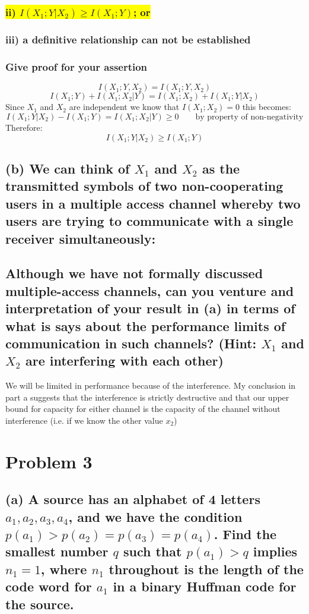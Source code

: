 \documentclass[11pt, oneside]{book}   	%
\begin{document}
\subsubsection{\colorbox{yellow}{ ii)  $I(X_1;Y|X_2) \geq I(X_1;Y)$; or} }
\subsubsection{iii) a definitive relationship can not be established }
\subsubsection{Give proof for your assertion}

$$I(X_1;Y,X_2) = I(X_1;Y,X_2)$$
$$I(X_1;Y) + I(X_1;X_2|Y) = I(X_1;X_2)+I(X_1;Y|X_2)$$
Since $X_1$ and $X_2$ are independent we know that $I(X_1;X_2)=0$ this becomes:
$$I(X_1;Y|X_2) - I(X_1;Y) = I(X_1;X_2|Y) \geq 0 \qquad \text{by property of non-negativity}$$
Therefore:
$$I(X_1;Y|X_2) \geq I(X_1;Y)$$

\subsection*{(b) We can think of $X_1$ and $X_2$ as the transmitted symbols of two non-cooperating users in a multiple access channel whereby two users are trying to communicate with a single receiver simultaneously:\\\\
Although we have not formally discussed multiple-access channels, can you venture and interpretation of your result in (a) in terms of what is says about the performance limits of communication in such channels? (Hint: $X_1$ and $X_2$ are interfering with each other)}

We will be limited in performance because of the interference.  My conclusion in part a suggests that the interference is strictly destructive and that our upper bound for capacity for either channel is the capacity of the channel without interference (i.e. if we know the other value $x_2$)



\section{Problem 3}
\subsection*{(a) A source has an alphabet of 4 letters $a_1,a_2,a_3,a_4$, and we have the condition $p(a_1) > p(a_2) = p(a_3) = p(a_4)$.  Find the smallest number $q$ such that $p(a_1) > q$ implies $n_1 = 1$, where $n_1$ throughout is the length of the code word for $a_1$ in a binary Huffman code for the source.}
\end{document}

